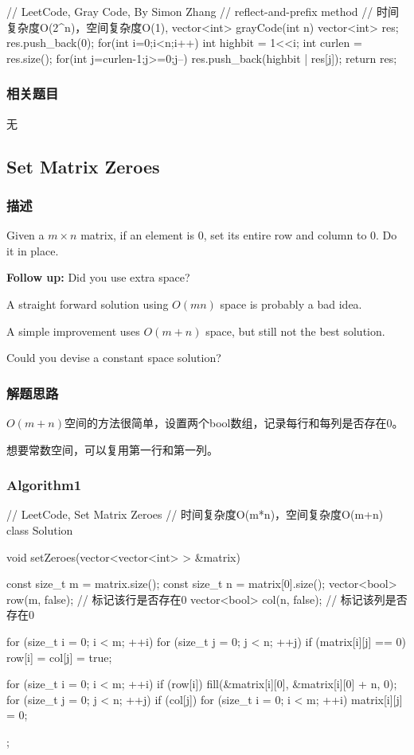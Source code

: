 \begin{Code}
	// LeetCode, Gray Code, By Simon Zhang
	// reflect-and-prefix method
	// 时间复杂度O(2^n)，空间复杂度O(1), 
	vector<int> grayCode(int n) {
		vector<int> res;
		res.push_back(0);
		for(int i=0;i<n;i++){
			int highbit = 1<<i;
			int curlen = res.size();
			for(int j=curlen-1;j>=0;j--)
			res.push_back(highbit | res[j]);
		}
		return res;
	}
\end{Code}


\subsubsection{相关题目}
\begindot
\item 无
\myenddot


\subsection{Set Matrix Zeroes} %
\label{sec:set-matrix-zeroes}


\subsubsection{描述}
Given a $m \times n$ matrix, if an element is 0, set its entire row and column 
to 0. Do it in place.

\textbf{Follow up:}
Did you use extra space?

A straight forward solution using $O(mn)$ space is probably a bad idea.

A simple improvement uses $O(m + n)$ space, but still not the best solution.

Could you devise a constant space solution?


\subsubsection{解题思路}
$O(m+n)$空间的方法很简单，设置两个bool数组，记录每行和每列是否存在0。

想要常数空间，可以复用第一行和第一列。


\subsubsection{Algorithm1}
\begin{Code}
	// LeetCode, Set Matrix Zeroes
	// 时间复杂度O(m*n)，空间复杂度O(m+n)
	class Solution {
		void setZeroes(vector<vector<int> > &matrix) {
			const size_t m = matrix.size();
			const size_t n = matrix[0].size();
			vector<bool> row(m, false); // 标记该行是否存在0
			vector<bool> col(n, false); // 标记该列是否存在0
			
			for (size_t i = 0; i < m; ++i) {
				for (size_t j = 0; j < n; ++j) {
					if (matrix[i][j] == 0) 
						row[i] = col[j] = true;
				}
			}
			
			for (size_t i = 0; i < m; ++i) {
				if (row[i])
					fill(&matrix[i][0], &matrix[i][0] + n, 0);
			}
			for (size_t j = 0; j < n; ++j) 
				if (col[j]) 
					for (size_t i = 0; i < m; ++i) 
						matrix[i][j] = 0;
		}
	};
\end{Code}


